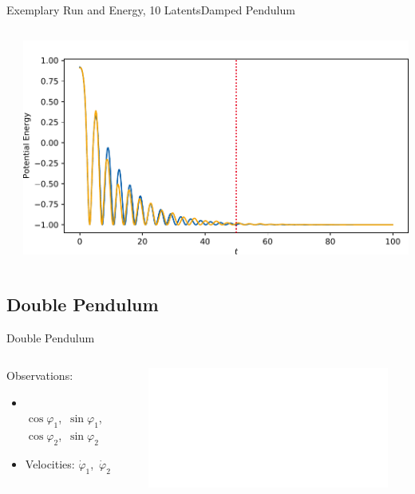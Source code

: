 \documentclass[
	aspectratio=43,
	color={accentcolor=1c},
	logo=false,
	colorframetitle=true,
	handout
]{tudabeamer}
\begin{document}
\begin{frame}{Exemplary Run and Energy, 10 Latents}{Damped Pendulum}
\begin{columns}
\begin{column}{0.333\linewidth}
\begin{center}
						\end{center}
					\end{column}
					\begin{column}{0.333\linewidth}
						\begin{center}
							\includegraphics[width=\linewidth]{figures/experiments/pendulum-damped/energy-R110-N0-potential.pdf}
						\end{center}
					\end{column}
				\end{columns}
			\end{frame}

		\subsection{Double Pendulum}
			\begin{frame}{Double Pendulum}
				\begin{columns}[c]
					\begin{column}{0.35\linewidth}
						Observations:
						\begin{itemize}
							\item {} \\
								\quad \(\cos\varphi_1\),\, \(\sin\varphi_1\), \\
								\quad \(\cos\varphi_2\),\, \(\sin\varphi_2\)
							\item Velocities: \(\dot{\varphi}_1\),\, \(\dot{\varphi}_2\)
						\end{itemize}
						\begin{center}
							\resizebox{0.85\linewidth}{!}{\tikzDoublePendulum}
						\end{center}
					\end{column}
					\begin{column}{0.65\linewidth}
						\begin{center}
							\includegraphics<2->[width=\linewidth]{figures/experiments/acrobot-gym/log-likelihood.pdf}
						\end{center}
					\end{column}
				\end{columns}
			\end{frame}
\end{document}
